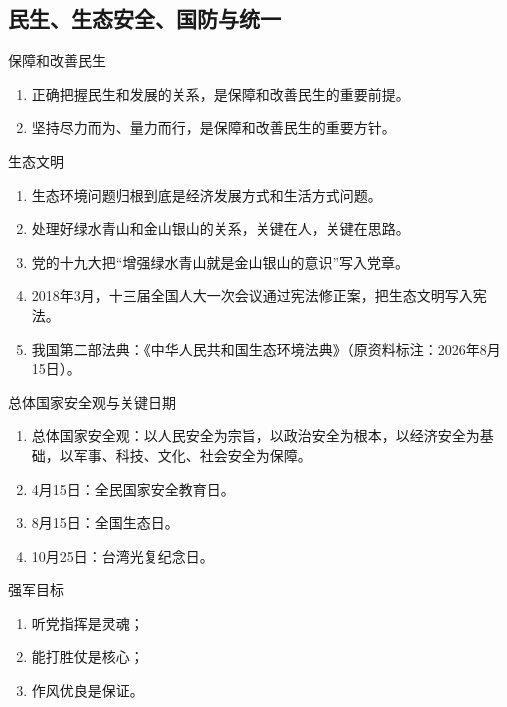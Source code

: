 \documentclass[12pt,a4paper]{ctexart}
\begin{document}
\subsection{民生、生态安全、国防与统一}

\begin{yellowbox}{保障和改善民生}
\begin{enumerate}
  \item 正确把握民生和发展的关系，是保障和改善民生的重要前提。
  \item 坚持尽力而为、量力而行，是保障和改善民生的重要方针。
\end{enumerate}
\end{yellowbox}

\begin{yellowbox}{生态文明}
\begin{enumerate}
  \item 生态环境问题归根到底是经济发展方式和生活方式问题。
  \item 处理好绿水青山和金山银山的关系，关键在人，关键在思路。
  \item 党的十九大把“增强绿水青山就是金山银山的意识”写入党章。
  \item 2018年3月，十三届全国人大一次会议通过宪法修正案，把生态文明写入宪法。
  \item 我国第二部法典：《中华人民共和国生态环境法典》（原资料标注：2026年8月15日）。
\end{enumerate}
\end{yellowbox}

\begin{yellowbox}{总体国家安全观与关键日期}
\begin{enumerate}
  \item 总体国家安全观：以人民安全为宗旨，以政治安全为根本，以经济安全为基础，以军事、科技、文化、社会安全为保障。
  \item 4月15日：全民国家安全教育日。
  \item 8月15日：全国生态日。
  \item 10月25日：台湾光复纪念日。
\end{enumerate}
\end{yellowbox}

\begin{yellowbox}{强军目标}
\begin{enumerate}
  \item 听党指挥是灵魂；
  \item 能打胜仗是核心；
  \item 作风优良是保证。
\end{enumerate}
\end{yellowbox}
\end{document}
